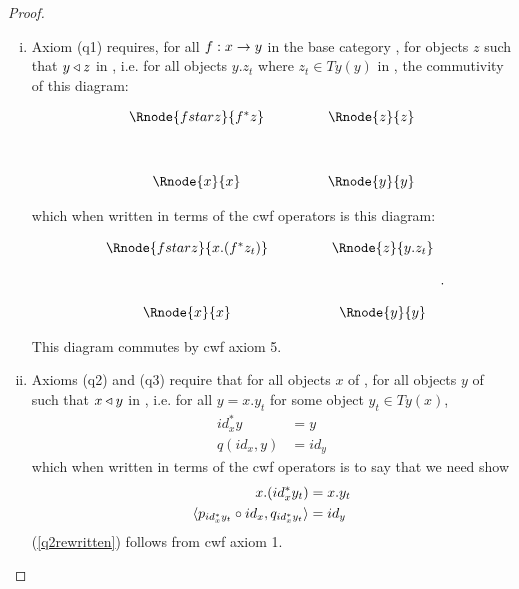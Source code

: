 \begin{proof}
\begin{enumerate}[(i)]
\item 
Axiom (q1) requires,  
for all $f: x \rightarrow y$ in the base category \catcw, for objects $z$ such that $y \triangleleft z$ in \catcw, i.e. for all objects $y.z_t$ where $z_t \in Ty(y)$ in \catcw
, the commutivity of this diagram:
\vspace{3mm}
\begin{center}
\begin{displaymath}
\begin{array}{cp{.9cm}c}
\Rnode{fstarz}{f^*z} & & \Rnode{z}{z}\\ [1.2cm]
\Rnode{x}{x}         & & \Rnode{y}{y}
\end{array}
\end{displaymath}
\end{center}
which when written in terms of the cwf operators is this diagram:
\vspace{3mm}
\begin{center}
\begin{displaymath}
\begin{array}{cp{.9cm}c}
\Rnode{fstarz}{x.(f^*z_t)} & & \Rnode{z}{y.z_t}\\ [1.2cm]
\Rnode{x}{x}         & & \Rnode{y}{y}
\end{array}
.
\end{displaymath}
\end{center}

This diagram commutes by cwf axiom 5.

\item
Axioms (q2) and (q3) require that 
for all objects $x$ of \catcw, for all objects $y$ of \catcw such that $x \triangleleft y$ in , i.e. for all $y=x.y_t$ for some object
$y_t \in Ty(x)$, 
\begin{align}
id_x^*y   & =y \\
q(id_x,y) & = id_y
\end{align}
which when written in terms of the cwf operators is to say that we need show
\begin{align}
x.(id_x^*y_t)   & = x.y_t \label{q2rewritten}\\
\langle p_{id_x^*y_t} \circ id_x,q_{id_x^*y_t}\rangle & = id_y \label{q3rewritten}
\end{align}
(\ref{q2rewritten}) follows from cwf axiom 1.


\end{enumerate}
\end{proof}
